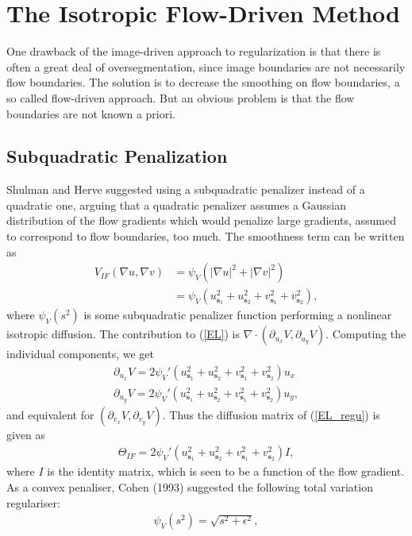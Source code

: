 \chapter{The Isotropic Flow-Driven Method}
One drawback of the image-driven approach to regularization is that there is often a great deal of oversegmentation, since image boundaries are not necessarily flow boundaries. The solution is to decrease the smoothing on flow boundaries, a so called flow-driven approach. But an obvious problem is that the flow boundaries are not known a priori.
\section{Subquadratic Penalization}
Shulman and Herve \cite{ShulmanHerve} suggested using a subquadratic penalizer instead of a quadratic one, arguing that a quadratic penalizer assumes a Gaussian distribution of the flow gradients which would penalize large gradients, assumed to correspond to flow boundaries, too much. The smoothness term can be written as
\begin{align*}
V_{IF}(\nabla u, \nabla v) &= \psi_V \left( |\nabla u|^2 + |\nabla v|^2 \right) \\ 
&= \psi_V \left( u_{\textbf{s}_1}^2 + u_{\textbf{s}_2}^2 + v_{\textbf{s}_1}^2 + v_{\textbf{s}_2}^2 \right),
\end{align*} 
where $\psi_V(s^2)$ is some subquadratic penalizer function performing a nonlinear isotropic diffusion. The contribution to (\ref{EL}) is $\nabla \cdot (\partial_{u_x} V, \partial_{u_y} V)$. Computing the individual components, we get
\begin{align*}
\partial_{u_x} V = 2 \psi_V' \left( u_{\textbf{s}_1}^2 + u_{\textbf{s}_2}^2 + v_{\textbf{s}_1}^2 + v_{\textbf{s}_2}^2 \right) u_x \\
\partial_{u_y} V = 2 \psi_V' \left( u_{\textbf{s}_1}^2 + u_{\textbf{s}_2}^2 + v_{\textbf{s}_1}^2 + v_{\textbf{s}_2}^2 \right) u_y,
\end{align*}
and equivalent for $(\partial_{v_x} V, \partial_{v_y} V)$. Thus the diffusion matrix of (\ref{EL_regu}) is given as
\begin{align*}
\Theta_{IF} = 2 \psi_V'\left( u_{\textbf{s}_1}^2 + u_{\textbf{s}_2}^2 + v_{\textbf{s}_1}^2 + v_{\textbf{s}_2}^2 \right) I,
\end{align*}
where $I$ is the identity matrix, which is seen to be a function of the flow gradient. As a convex penaliser, Cohen (1993) suggested the following total variation regulariser:
\begin{align}
\label{TV_regu}
\psi_V(s^2) = \sqrt{s^2 + \epsilon^2},
\end{align} 
